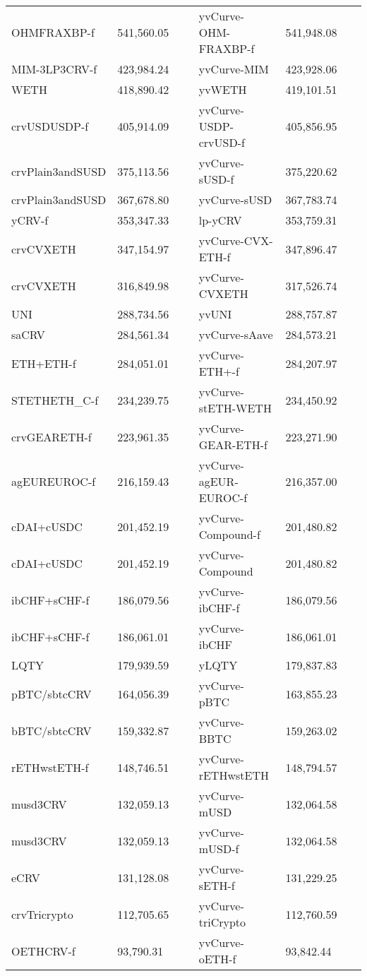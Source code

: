 \begin{longtable}{@{}p{0.25\linewidth}p{0.25\linewidth}p{0.25\linewidth}p{0.25\linewidth}@{}}
OHMFRAXBP-f & 541,560.05 & yvCurve-OHM-FRAXBP-f &541,948.08 \\
MIM-3LP3CRV-f & 423,984.24 & yvCurve-MIM &423,928.06 \\
WETH & 418,890.42 & yvWETH &419,101.51 \\
crvUSDUSDP-f & 405,914.09 & yvCurve-USDP-crvUSD-f &405,856.95 \\
crvPlain3andSUSD & 375,113.56 & yvCurve-sUSD-f &375,220.62 \\
crvPlain3andSUSD & 367,678.80 & yvCurve-sUSD &367,783.74 \\
yCRV-f & 353,347.33 & lp-yCRV &353,759.31 \\
crvCVXETH & 347,154.97 & yvCurve-CVX-ETH-f &347,896.47 \\
crvCVXETH & 316,849.98 & yvCurve-CVXETH &317,526.74 \\
UNI & 288,734.56 & yvUNI &288,757.87 \\
saCRV & 284,561.34 & yvCurve-sAave &284,573.21 \\
ETH+ETH-f & 284,051.01 & yvCurve-ETH+-f &284,207.97 \\
STETHETH_C-f & 234,239.75 & yvCurve-stETH-WETH &234,450.92 \\
crvGEARETH-f & 223,961.35 & yvCurve-GEAR-ETH-f &223,271.90 \\
agEUREUROC-f & 216,159.43 & yvCurve-agEUR-EUROC-f &216,357.00 \\
cDAI+cUSDC & 201,452.19 & yvCurve-Compound-f &201,480.82 \\
cDAI+cUSDC & 201,452.19 & yvCurve-Compound &201,480.82 \\
ibCHF+sCHF-f & 186,079.56 & yvCurve-ibCHF-f &186,079.56 \\
ibCHF+sCHF-f & 186,061.01 & yvCurve-ibCHF &186,061.01 \\
LQTY & 179,939.59 & yLQTY &179,837.83 \\
pBTC/sbtcCRV & 164,056.39 & yvCurve-pBTC &163,855.23 \\
bBTC/sbtcCRV & 159,332.87 & yvCurve-BBTC &159,263.02 \\
rETHwstETH-f & 148,746.51 & yvCurve-rETHwstETH &148,794.57 \\
musd3CRV & 132,059.13 & yvCurve-mUSD &132,064.58 \\
musd3CRV & 132,059.13 & yvCurve-mUSD-f &132,064.58 \\
eCRV & 131,128.08 & yvCurve-sETH-f &131,229.25 \\
crvTricrypto & 112,705.65 & yvCurve-triCrypto &112,760.59 \\
OETHCRV-f & 93,790.31 & yvCurve-oETH-f &93,842.44 \\

\end{longtable}
